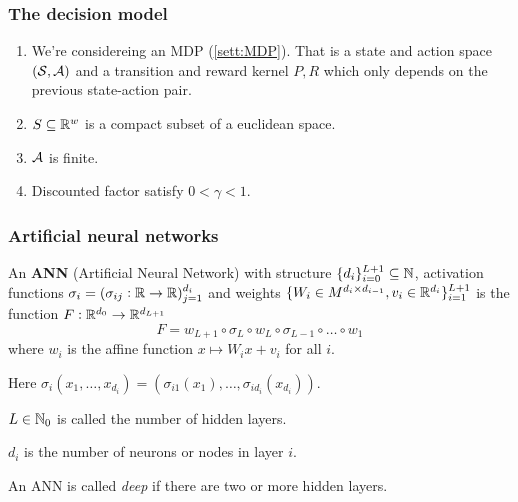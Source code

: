 

\subsubsection{The decision model}

\begin{sett}[Fan et al.]
  \leavevmode
  \begin{enumerate}
    \item We're considereing an MDP (\cref{sett:MDP}).
      That is a state and action space
      $(\mathcal{S}, \mathcal{A})$ and a transition and reward kernel $P, R$
      which only depends on the previous state-action pair.
    \item $S \subseteq \mathbb{R}^w$ is a compact subset of a euclidean space.
    \item $\mathcal{A}$ is finite.
    \item Discounted factor satisfy $0 < \gamma < 1$.
  \end{enumerate}
\end{sett}


\subsubsection{Artificial neural networks}

\begin{defn}\label{def_ANN}
  An \textbf{ANN} (Artificial Neural Network) with structure
  $\{ d_i \}_{i=0}^{L+1} \subseteq \mathbb{N}$,
  activation functions $\sigma_i = (\sigma_{ij} : \mathbb{R} \to \mathbb{R})_{j=1}^{d_i}$
  and weights $\{ W_i \in M^{d_i \times d_{i-1}}, v_i \in \mathbb{R}^{d_i} \}_{i=1}^{L+1}$
  is the function $F:\mathbb{R}^{d_0} \to \mathbb{R}^{d_{L+1}}$ 
  \[ F = w_{L+1} \circ \sigma_L \circ w_L
  \circ \sigma_{L-1} \circ \dots \circ w_1 \]
  where $w_i$ is the affine function $x \mapsto W_i x + v_i$ for all $i$.

  Here $\sigma_i(x_1, \dots, x_{d_i})
  = (\sigma_{i1}(x_1), \dots, \sigma_{id_{i}}(x_{d_{i}}))$.

  $L \in \mathbb{N}_0$ is called the number of hidden layers.

  $d_i$ is the number of neurons or nodes in layer $i$.
\end{defn}

An ANN is called \emph{deep} if there are two or more hidden layers.

